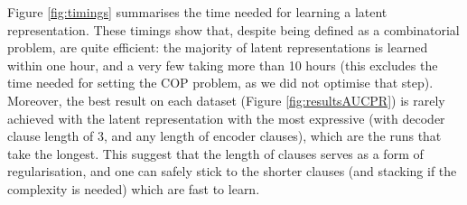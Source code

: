 Figure \ref{fig:timings} summarises the time needed for learning a  latent representation.
These timings show that, despite being defined as a combinatorial problem,  are quite efficient: the majority of latent representations is learned within one hour, and a very few taking more than 10 hours (this excludes the time needed for setting the COP problem, as we did not optimise that step). 
Moreover, the best result on each dataset (Figure \ref{fig:resultsAUCPR}) is rarely achieved with the latent representation with the most expressive \alp{} (with decoder clause length of 3, and any length of encoder clauses), which are the runs that take the longest.
This suggest that the length of clauses serves as a form of regularisation, and one can safely stick to the shorter clauses (and stacking if the complexity is needed) which are fast to learn. 



%
%
%
%
%









